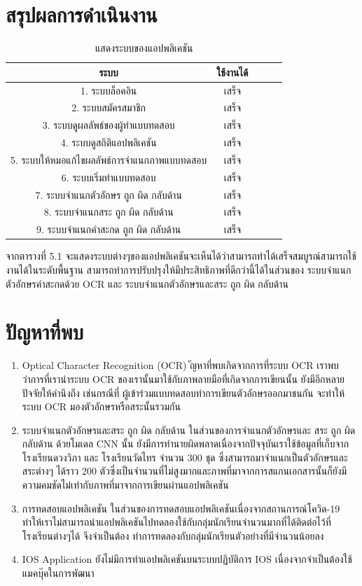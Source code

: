 \documentclass[12pt,oneside,openright,a4paper]{cpe-thai-project}
\begin{document}
\section{สรุปผลการดำเนินงาน}
\begin{table}[!h]\centering
  \caption{แสดงระบบของแอปพลิเคชัน}\label{tbl:application1}
  \begin{tabular}{|c|c|l|rr|} \hline
    ระบบ & ใช้งานได้ \\ \hline
    1.	ระบบล็อคอิน & เสร็จ \\ \hline
    2.	ระบบสมัครสมาชิก & เสร็จ \\ \hline
    3.	ระบบดูผลลัพธ์ของผู้ทำแบบทดสอบ & เสร็จ \\ \hline
    4.	ระบบดูสถิติแอปพลิเคชัน & เสร็จ \\ \hline
    5.	ระบบให้หมอแก้ไขผลลัพธ์การจำแนกภาพแบบทดสอบ & เสร็จ \\ \hline
    6.	ระบบเริ่มทำแบบทดสอบ & เสร็จ \\ \hline
    7.	ระบบจำแนกตัวอักษร ถูก ผิด กลับด้าน & เสร็จ \\ \hline
    8.	ระบบจำแนกสระ ถูก ผิด กลับด้าน & เสร็จ \\ \hline
    9.	ระบบจำแนกคำสะกด ถูก ผิด กลับด้าน & เสร็จ \\ \hline
  \end{tabular}
  \end{table}
  จากตารางที่ 5.1 จะแสดงระบบต่างๆของแอปพลิเคชันจะเห็นได้ว่าสามารถทำได้เสร็จสมบูรณ์สามารถใช้งานได้ในระดับพื้นฐาน สามารถทำการปรับปรุงให้มีประสิทธิภาพที่ดีกว่านี้ได้ในส่วนของ
  ระบบจำแนกตัวอักษรคำสะกดด้วย OCR และ ระบบจำแนกตัวอักษรและสระ ถูก ผิด กลับด้าน
\section{ปัญหาที่พบ}
\begin{enumerate}
  \item Optical Character Recognition (OCR)
ัญหาที่พบเกิดจากการที่ระบบ OCR เราพบว่าการที่เรานำระบบ OCR ของเรานั้นมาใช้กับภาพลายมือที่เกิดจากการเขียนนั้น ยังมีอีกหลายปัจจัยให้คำนึงถึง เช่นกรณีที่ ผู้เข้าร่วมแบบทดสอบทำการเขียนตัวอักษรออกมาชนกัน
        จะทำให้ระบบ OCR มองตัวอักษรหรือสระนั้นรวมกัน 
  \item ระบบจำแนกตัวอักษรและสระ ถูก ผิด กลับด้าน
        ในส่วนของการจำแนกตัวอักษรและ สระ ถูก ผิด กลับด้าน ด้วยโมเดล CNN นั้น ยังมีการทำนายผิดพลาดเนื่องจากปัจจุบันเราใช้ข้อมูลที่เก็บจากโรงเรียนดวงวิภา และ โรงเรียนวัดไทร จำนวน 300 ชุด
        ซึ่งสามารถมาจำแนกเป็นตัวอักษรและสระต่างๆ ได้ราว 200 ตัวซึ่งเป็นจำนวนที่ไม่สูงมากและภาพที่มาจากการสแกนเอกสารนั้นก็ยังมีความคมชัดไม่เท่ากับภาพที่มาจากการเขียนผ่านแอปพลิเคชัน
  \item การทดสอบแอปพลิเคชัน
        ในส่วนของการทดสอบแอปพลิเคชันเนื่องจากสถานการณ์โควิด-19 ทำให้เราไม่สามารถนำแอปพลิเคชันไปทดลองใช้กับกลุ่มนักเรียนจำนวนมากที่ได้ติดต่อไว้ที่โรงเรียนต่างๆได้ จึงจำเป็นต้อง
        ทำการทดลองกับกลุ่มนักเรียนตัวอย่างที่มีจำนวนน้อยลง  
  \item IOS Application
        ยังไม่มีการทำแอปพลิเคชันบนระบบปฏิบัติการ IOS เนื่องจากจำเป็นต้องใช้แมคบุ๊คในการพัฒนา
  \end{enumerate}
\end{document}
